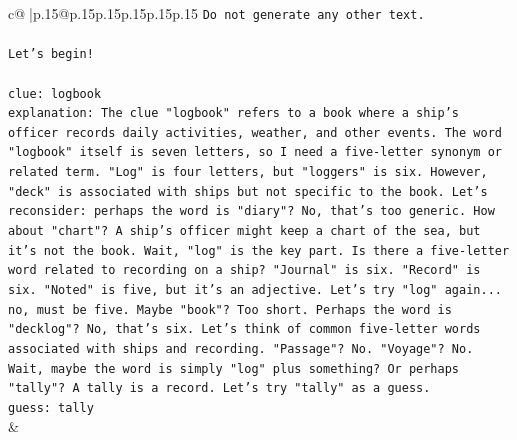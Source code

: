 \documentclass{article}
\begin{document}
{\begin{supertabular}{c@{$\;$}|p{.15\linewidth}@{}p{.15\linewidth}p{.15\linewidth}p{.15\linewidth}p{.15\linewidth}p{.15\linewidth}}
{{{\texttt{Do not generate any other text.} \\
\\ 
\texttt{Let's begin!} \\
\\ 
\texttt{clue: logbook} \\
\texttt{explanation: The clue "logbook" refers to a book where a ship's officer records daily activities, weather, and other events. The word "logbook" itself is seven letters, so I need a five{-}letter synonym or related term. "Log" is four letters, but "loggers" is six. However, "deck" is associated with ships but not specific to the book. Let's reconsider: perhaps the word is "diary"? No, that's too generic. How about "chart"? A ship's officer might keep a chart of the sea, but it's not the book. Wait, "log" is the key part. Is there a five{-}letter word related to recording on a ship? "Journal" is six. "Record" is six. "Noted" is five, but it's an adjective. Let's try "log" again... no, must be five. Maybe "book"? Too short. Perhaps the word is "decklog"? No, that's six. Let's think of common five{-}letter words associated with ships and recording. "Passage"? No. "Voyage"? No. Wait, maybe the word is simply "log" plus something? Or perhaps "tally"? A tally is a record. Let's try "tally" as a guess.} \\
\texttt{guess: tally} \\
            }
        }
    }
    & \\ \\


\end{supertabular}}
\end{document}
